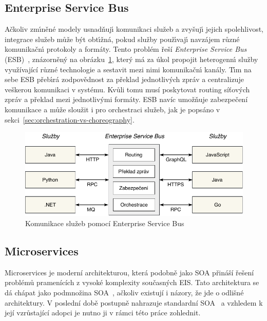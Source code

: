 \subsection{Enterprise Service Bus}

Ačkoliv zm\'{\i}něné modely usnadňuj\'{\i} komunikaci služeb a zvyšuj\'{\i} jejich
spolehlivost, integrace služeb může b\'yt obt\'{\i}žná, pokud služby použ\'{\i}vaj\'{\i}
navzájem různé komunikačn\'{\i} protokoly a formáty. Tento problém řeší \textit{Enterprise Service
Bus} (\gls{ESB})~\cite{chappell2004enterprise}, znázorněn\'y na obrázku~\ref{fig:enterprise-service-bus},
kter\'y má za úkol propojit heterogenn\'{\i} služby využívající různé technologie a sestavit mezi nimi
komunikačn\'{\i} kanály. T\'{\i}m na sebe \gls{ESB} přeb\'{\i}rá zodpovědnost za překlad jednotliv\'ych zpráv
a centralizuje veškerou komunikaci v systému. Kvůli tomu musí poskytovat routing síťových zpráv a překlad mezi
jednotlivými formáty. \gls{ESB} navíc umožňuje zabezpečení komunikace a může sloužit i pro orchestraci služeb,
jak je popsáno v sekci~\ref{sec:orchestration-vs-choreography}.

\begin{figure}
    \centering
    \includegraphics[keepaspectratio=true, width=0.8\linewidth]{figures/enterprise-service-bus.pdf}
    \caption{Komunikace služeb pomocí Enterprise Service Bus}
    \label{fig:enterprise-service-bus}
\end{figure}

\subsection{Microservices}\label{sec:microservices}

Microservices je moderní architekturou, která podobně jako \gls{SOA} přináší řešení
problémů pramenících z vysoké komplexity současných \gls{EIS}. Tato architektura se dá
chápat jako podmnožina \gls{SOA}~\cite{cerny2017disambiguation, richards2015microservices},
ačkoliv existují i názory, že jde o odlišné architektury. V poslední době postupně nahrazuje standardní
\gls{SOA}~\cite{lewis2014microservices, xiao2016reflections} a vzhledem k její vzrůstající
adopci je nutno ji v rámci této práce zohlednit.

